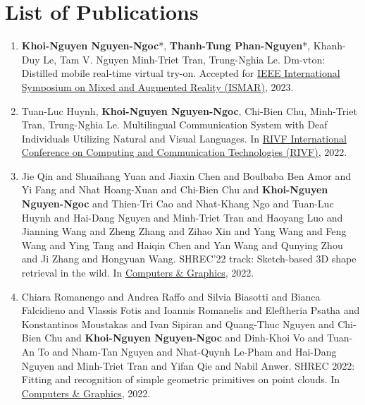 \chapter*{List of Publications}
\label{publication}

\begin{enumerate}
    \item \textbf{Khoi-Nguyen Nguyen-Ngoc}*, \textbf{Thanh-Tung Phan-Nguyen}*, Khanh-Duy Le, Tam V. Nguyen Minh-Triet Tran, Trung-Nghia Le. Dm-vton: Distilled mobile real-time virtual try-on. Accepted for \uline{IEEE International Symposium on Mixed and Augmented Reality (ISMAR)}, 2023.
    \item Tuan-Luc Huynh, \textbf{Khoi-Nguyen Nguyen-Ngoc}, Chi-Bien Chu, Minh-Triet Tran, Trung-Nghia Le. Multilingual Communication System with Deaf Individuals Utilizing Natural and Visual Languages. In \uline{RIVF International Conference on Computing and Communication Technologies (RIVF)}, 2022.
    \item Jie Qin and Shuaihang Yuan and Jiaxin Chen and Boulbaba {Ben Amor} and Yi Fang and Nhat Hoang-Xuan and Chi-Bien Chu and \textbf{Khoi-Nguyen Nguyen-Ngoc} and Thien-Tri Cao and Nhat-Khang Ngo and Tuan-Luc Huynh and Hai-Dang Nguyen and Minh-Triet Tran and Haoyang Luo and Jianning Wang and Zheng Zhang and Zihao Xin and Yang Wang and Feng Wang and Ying Tang and Haiqin Chen and Yan Wang and Qunying Zhou and Ji Zhang and Hongyuan Wang. SHREC’22 track: Sketch-based 3D shape retrieval in the wild. In \uline{Computers \& Graphics}, 2022.
    \item Chiara Romanengo and Andrea Raffo and Silvia Biasotti and Bianca Falcidieno and Vlassis Fotis and Ioannis Romanelis and Eleftheria Psatha and Konstantinos Moustakas and Ivan Sipiran and Quang-Thuc Nguyen and Chi-Bien Chu and \textbf{Khoi-Nguyen Nguyen-Ngoc} and Dinh-Khoi Vo and Tuan-An To and Nham-Tan Nguyen and Nhat-Quynh Le-Pham and Hai-Dang Nguyen and Minh-Triet Tran and Yifan Qie and Nabil Anwer. SHREC 2022: Fitting and recognition of simple geometric primitives on point clouds. In \uline{Computers \& Graphics}, 2022.
\end{enumerate}